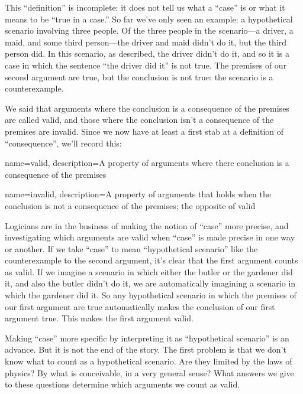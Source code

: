 This ``definition'' is incomplete: it does not tell us what a ``case'' is or what it means to be ``true in a case.''  So far we've only seen an example: a hypothetical scenario involving three people. Of the three people in the scenario---a driver, a maid, and some third person---the driver and maid didn't do it, but the third person did. In this scenario, as described, the driver didn't do it, and so it is a case in which the sentence ``the driver did it'' is not true. The premises of our second argument are true, but the conclusion is not true: the scenario is a counterexample.

We said that arguments where the conclusion is a consequence of the premises are called valid, and those where the conclusion isn't a consequence of the premises are invalid. Since we now have at least a first stab at a definition of ``consequence'', we'll record this: 


{
name=valid,
description={A property of arguments where there conclusion is a consequence of the premises}
}

{
name=invalid,
description={A property of arguments that holds when the conclusion is not a consequence of the premises; the opposite of \gls{valid}}
}

Logicians are in the business of making the notion of ``case'' more precise, and investigating which arguments are valid when ``case'' is made precise in one way or another. If we take ``case'' to mean ``hypothetical scenario'' like the counterexample to the second argument, it's clear that the first argument counts as valid. If we imagine a scenario in which either the butler or the gardener did it, and also the butler didn't do it, we are automatically imagining a scenario in which the gardener did it. So any hypothetical scenario in which the premises of our first argument are true automatically makes the conclusion of our first argument true. This makes the first argument valid.

Making ``case'' more specific by interpreting it as ``hypothetical scenario'' is an advance. But it is not the end of the story.  The first problem is that we don't know what to count as a hypothetical scenario. Are they limited by the laws of physics? By what is conceivable, in a very general sense?  What answers we give to these questions determine which arguments we count as valid.

